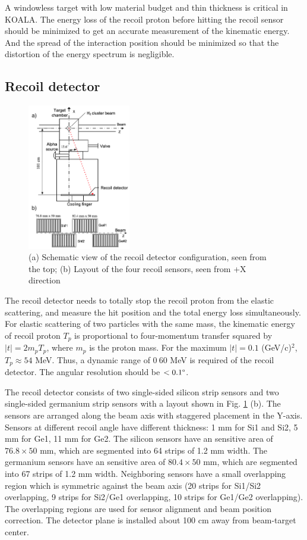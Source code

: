 \documentclass[number,5p]{elsarticle}
\begin{document}
A windowless target with low material budget and thin thickness is critical in KOALA.
The energy loss of the recoil proton before hitting the recoil sensor should be minimized to get an accurate measurement of the kinematic energy.
And the spread of the interaction position should be minimized so that the distortion of the energy spectrum is negligible. 

\subsection{Recoil detector}
\label{sec:recoil}

\begin{figure}[htbp]
\centering
\includegraphics[width=0.4\textwidth]{./recoil_schematic.png}
\caption{(a) Schematic view of the recoil detector configuration, seen from the
  top; (b) Layout of the four recoil sensors, seen from +X direction}
\label{fig:recoil_schematic}
\end{figure}

The recoil detector needs to totally stop the recoil proton from the
elastic scattering, and measure the hit position and the total energy loss simultaneously.
For elastic scattering of two particles with the same mass,
the kinematic energy of recoil proton \(T_p\) is proportional to four-momentum
transfer squared by \(|t| = 2m_pT_p\), where \(m_p\) is the proton mass.
For the maximum \(|t|=0.1\) (GeV/c)$^2$, \(T_p \approx 54\) MeV. Thus, a dynamic range of
$0~60$ MeV is required of the recoil detector. The angular resolution should be
$< 0.1\degree$.

The recoil detector consists of two single-sided silicon strip sensors and two single-sided germanium strip sensors with a layout shown in Fig. \ref{fig:recoil_schematic} (b).
The sensors are arranged along the beam axis with staggered placement in the Y-axis.
Sensors at different recoil angle have different thickness: 1 mm for Si1 and Si2, 5 mm for Ge1, 11 mm for Ge2.
The silicon sensors have an sensitive area of \(76.8 \times 50\) mm, which are segmented into 64 strips of 1.2 mm width.
The germanium sensors have an sensitive area of \(80.4 \times 50\) mm, which are segmented into 67 strips of 1.2 mm width.
Neighboring sensors have a small overlapping region which is symmetric against
the beam axis (20 strips for Si1/Si2 overlapping, 9 strips for Si2/Ge1 overlapping, 10 strips for Ge1/Ge2 overlapping).
The overlapping regions are used for sensor alignment and beam position correction.
The detector plane is installed about 100 cm away from beam-target center.
\end{document}
